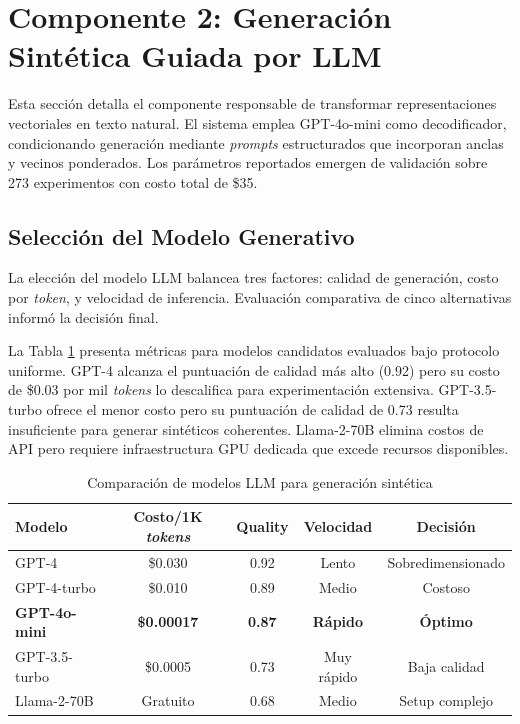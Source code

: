 \section{Componente 2: Generación Sintética Guiada por LLM}
\label{sec:generacion_llm}

Esta sección detalla el componente responsable de transformar representaciones vectoriales en texto natural. El sistema emplea GPT-4o-mini como decodificador, condicionando generación mediante \textit{prompts} estructurados que incorporan anclas y vecinos ponderados. Los parámetros reportados emergen de validación sobre 273 experimentos con costo total de \$35.

\subsection{Selección del Modelo Generativo}
\label{subsec:seleccion_modelo}

La elección del modelo LLM balancea tres factores: calidad de generación, costo por \textit{token}, y velocidad de inferencia. Evaluación comparativa de cinco alternativas informó la decisión final.

La Tabla \ref{tab:model_comparison} presenta métricas para modelos candidatos evaluados bajo protocolo uniforme. GPT-4 alcanza el puntuación de calidad más alto (0.92) pero su costo de \$0.03 por mil \textit{tokens} lo descalifica para experimentación extensiva. GPT-3.5-turbo ofrece el menor costo pero su puntuación de calidad de 0.73 resulta insuficiente para generar sintéticos coherentes. Llama-2-70B elimina costos de API pero requiere infraestructura GPU dedicada que excede recursos disponibles.

\begin{table}[h]
\centering
\caption{Comparación de modelos LLM para generación sintética}
\label{tab:model_comparison}
\begin{tabular}{lcccc}
\hline
Modelo & Costo/1K \textit{tokens} & Quality & Velocidad & Decisión \\
\hline
GPT-4 & \$0.030 & 0.92 & Lento & Sobredimensionado \\
GPT-4-turbo & \$0.010 & 0.89 & Medio & Costoso \\
\textbf{GPT-4o-mini} & \textbf{\$0.00017} & \textbf{0.87} & \textbf{Rápido} & \textbf{Óptimo} \\
GPT-3.5-turbo & \$0.0005 & 0.73 & Muy rápido & Baja calidad \\
Llama-2-70B & Gratuito & 0.68 & Medio & Setup complejo \\
\hline
\end{tabular}
\end{table}

